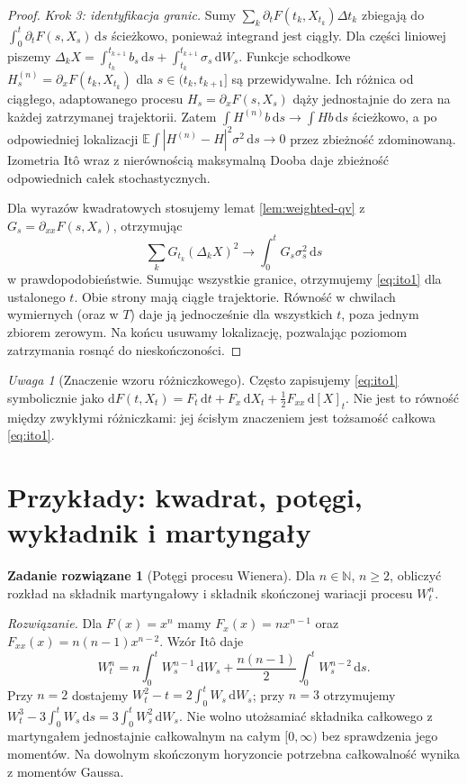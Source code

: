 \documentclass[11pt,a4paper,oneside]{report}
\numberwithin{equation}{chapter}
\theoremstyle{plain}
\theoremstyle{definition}
\newtheorem{zadanie}{Zadanie rozwiązane}[chapter]
\theoremstyle{remark}
\newtheorem{uwaga}{Uwaga}[chapter]
\newcommand{\N}{\mathbb{N}}
\newcommand{\E}{\mathbb{E}}
\newcommand{\dd}{\mathrm{d}}
\begin{document}
\begin{proof}
\emph{Krok 3: identyfikacja granic.} Sumy
$\sum_k\partial_tF(t_k,X_{t_k})\Delta t_k$
zbiegają do $\int_0^t\partial_tF(s,X_s)\,\dd s$
ścieżkowo, ponieważ integrand jest ciągły.
Dla części liniowej piszemy
$\Delta_kX=\int_{t_k}^{t_{k+1}}b_s\,\dd s
+\int_{t_k}^{t_{k+1}}\sigma_s\,\dd W_s$.
Funkcje schodkowe
$H_s^{(n)}=\partial_xF(t_k,X_{t_k})$ dla
$s\in(t_k,t_{k+1}]$ są przewidywalne. Ich różnica
od ciągłego, adaptowanego procesu
$H_s=\partial_xF(s,X_s)$ dąży jednostajnie do zera
na każdej zatrzymanej trajektorii. Zatem
$\int H^{(n)}b\,\dd s\to\int Hb\,\dd s$
ścieżkowo, a po odpowiedniej lokalizacji
$\E\int|H^{(n)}-H|^2\sigma^2\,\dd s\to0$ przez
zbieżność zdominowaną. Izometria Itô wraz z
nierównością maksymalną Dooba daje zbieżność
odpowiednich całek stochastycznych.

Dla wyrazów kwadratowych stosujemy lemat
\ref{lem:weighted-qv} z
$G_s=\partial_{xx}F(s,X_s)$, otrzymując
\[
\sum_kG_{t_k}(\Delta_kX)^2
\longrightarrow\int_0^tG_s\sigma_s^2\,\dd s
\]
w prawdopodobieństwie. Sumując wszystkie granice,
otrzymujemy \eqref{eq:ito1} dla ustalonego $t$.
Obie strony mają ciągłe trajektorie. Równość w chwilach
wymiernych (oraz w $T$) daje ją jednocześnie dla wszystkich
$t$, poza jednym zbiorem zerowym. Na końcu usuwamy
lokalizację, pozwalając poziomom zatrzymania rosnąć do nieskończoności.
\end{proof}

\begin{uwaga}[Znaczenie wzoru różniczkowego]
Często zapisujemy \eqref{eq:ito1} symbolicznie jako
$\dd F(t,X_t)=F_t\,\dd t+F_x\,\dd X_t
+\frac12F_{xx}\,\dd[X]_t$. Nie jest to równość
między zwykłymi różniczkami: jej ścisłym znaczeniem
jest tożsamość całkowa \eqref{eq:ito1}.
\end{uwaga}

\section{Przykłady: kwadrat, potęgi, wykładnik i martyngały}
\begin{zadanie}[Potęgi procesu Wienera]
Dla $n\in\N$, $n\ge2$, obliczyć rozkład na składnik
martyngałowy i składnik skończonej wariacji procesu $W_t^n$.

\emph{Rozwiązanie.} Dla $F(x)=x^n$ mamy
$F_x(x)=nx^{n-1}$ oraz $F_{xx}(x)=n(n-1)x^{n-2}$.
Wzór Itô daje
\[
W_t^n=n\int_0^tW_s^{n-1}\,\dd W_s
+\frac{n(n-1)}2\int_0^tW_s^{n-2}\,\dd s.
\]
Przy $n=2$ dostajemy $W_t^2-t=2\int_0^tW_s\,\dd W_s$;
przy $n=3$ otrzymujemy $W_t^3-3\int_0^tW_s\,\dd s
=3\int_0^tW_s^2\,\dd W_s$. Nie wolno utożsamiać
składnika całkowego z martyngałem jednostajnie
całkowalnym na całym $[0,\infty)$ bez sprawdzenia
jego momentów. Na dowolnym skończonym horyzoncie
potrzebna całkowalność wynika z momentów Gaussa.
\end{zadanie}
\end{document}
